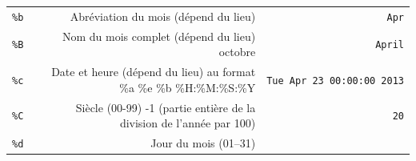 \documentclass[12pt,]{book}
\numberwithin{equation}{section}
\numberwithin{countremarque}{section}
\begin{document}
\begin{longtable}[]{@{}rrr@{}}
\begin{minipage}[t]{0.10\columnwidth}\raggedleft\strut
\texttt{\%b}\strut
\end{minipage} & \begin{minipage}[t]{0.60\columnwidth}\raggedleft\strut
Abréviation du mois (dépend du lieu)\strut
\end{minipage} & \begin{minipage}[t]{0.22\columnwidth}\raggedleft\strut
\texttt{Apr}\strut
\end{minipage}\tabularnewline
\begin{minipage}[t]{0.10\columnwidth}\raggedleft\strut
\texttt{\%B}\strut
\end{minipage} & \begin{minipage}[t]{0.60\columnwidth}\raggedleft\strut
Nom du mois complet (dépend du lieu) octobre\strut
\end{minipage} & \begin{minipage}[t]{0.22\columnwidth}\raggedleft\strut
\texttt{April}\strut
\end{minipage}\tabularnewline
\begin{minipage}[t]{0.10\columnwidth}\raggedleft\strut
\texttt{\%c}\strut
\end{minipage} & \begin{minipage}[t]{0.60\columnwidth}\raggedleft\strut
Date et heure (dépend du lieu) au format \%a \%e \%b
\%H:\%M:\%S:\%Y\strut
\end{minipage} & \begin{minipage}[t]{0.22\columnwidth}\raggedleft\strut
\texttt{Tue\ Apr\ 23\ 00:00:00\ 2013}\strut
\end{minipage}\tabularnewline
\begin{minipage}[t]{0.10\columnwidth}\raggedleft\strut
\texttt{\%C}\strut
\end{minipage} & \begin{minipage}[t]{0.60\columnwidth}\raggedleft\strut
Siècle (00-99) -1 (partie entière de la division de l'année par
100)\strut
\end{minipage} & \begin{minipage}[t]{0.22\columnwidth}\raggedleft\strut
\texttt{20}\strut
\end{minipage}\tabularnewline
\begin{minipage}[t]{0.10\columnwidth}\raggedleft\strut
\texttt{\%d}\strut
\end{minipage} & \begin{minipage}[t]{0.60\columnwidth}\raggedleft\strut
Jour du mois (01--31)\strut
\end{minipage} & \begin{minipage}[t]{0.22\columnwidth}\raggedleft\strut

\end{minipage}
\end{longtable}
\end{document}
